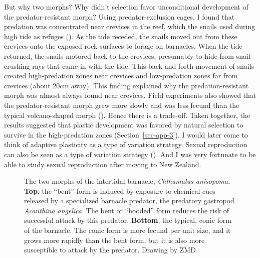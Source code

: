 \documentclass[
  letterpaper,
]{book}
\begin{document}
But why two morphs? Why didn't selection favor unconditional development
of the predator-resistant morph? Using predator-exclusion cages, I found
that predation was concentrated near crevices in the reef, which the
snails used during high tide as refuges
(). As the tide receded, the snails
moved out from these crevices onto the exposed rock surfaces to forage
on barnacles. When the tide returned, the snails motored back to the
crevices, presumably to hide from snail-crushing rays that came in with
the tide. This back-and-forth movement of snails created high-predation
zones near crevices and low-predation zones far from crevices (about
20cm away). This finding explained why the predation-resistant morph was
almost always found near crevices. Field experiments also showed that
the predator-resistant morph grew more slowly and was less fecund than
the typical volcano-shaped morph (). Hence there is a trade-off. Taken together, the results
suggested that plastic development was favored by natural selection to
survive in the high-predation zones (Section~\ref{sec-app-3}). I would
later come to think of adaptive plasticity as a type of variation
strategy. Sexual reproduction can also be seen as a type of variation
strategy (). And I was very
fortunate to be able to study sexual reproduction after moving to New
Zealand.

\begin{figure}


\caption[The two morphs of the intertidal barnacle, \emph{Chthamalus
anisopoma}]{\label{fig-3-2}The two morphs of the intertidal barnacle,
\emph{Chthamalus anisopoma}. \textbf{Top}, the ``bent'' form is induced
by exposure to chemical cues released by a specialized barnacle
predator, the predatory gastropod \emph{Acanthina angelica}. The bent or
``hooded'' form reduces the risk of successful attack by this predator.
\textbf{Bottom}, the typical, conic form of the barnacle. The conic form
is more fecund per unit size, and it grows more rapidly than the bent
form, but it is also more susceptible to attack by the predator. Drawing
by ZMD.}

\end{figure}%
\end{document}
